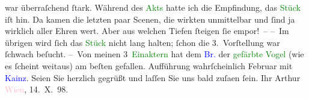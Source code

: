                     war überraſchend ſtark. Während des \textcolor{green}{Akts}{} hatte ich die Empfindung, das \textcolor{green}{Stück}{} iſt hin. Da kamen die letzten
                    paar Scenen, die wirkten unmittelbar und ſind ja wirklich aller Ehren wert. Aber
                    aus welchen {\pb}Tiefen ſteigen ſie empor! –\pend
           \pstart
           – Im übrigen wird ſich das \textcolor{green}{Stück}{} nicht lang halten; ſchon die 3. Vorſtellung war ſchwach
                    beſucht.\pend
           \pstart
           – Von meinen 3 \textcolor{green}{Einaktern}{}
                    hat dem \textcolor{blue}{Br.}{}\ledrightnote{\textcolor{blue}{Otto Brahm}} der \textcolor{green}{gefärbte Vogel}{} (wie es ſcheint
                    weitaus) am beſten gefallen. \introOben{}Aufführung wahrſcheinlich
                            Februar mit \textcolor{blue}{Kainz}{}\ledrightnote{\textcolor{blue}{Josef Kainz}}.\introOben{}\pend
           \pstart
           Seien Sie herzlich gegrüßt und laſſen Sie uns bald zuſa{\geminationm}en ſein.\pend
           \pstart Ihr \spacefill\mbox{Arthur}\pend{}\pstart
           \textcolor{pink}{Wien}{}\ledrightnote{\textcolor{pink}{Wien}},
                        14. X. 98.\pend
           \endnumbering{}  
      